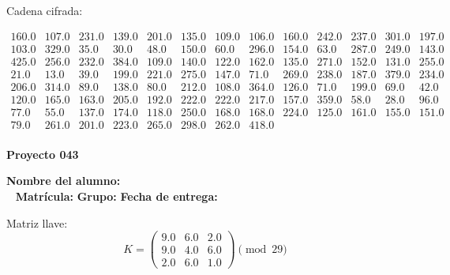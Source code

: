 \documentclass[12pt]{article}
\begin{document}
Cadena cifrada:
\begin{center}
$\begin{array}{lllllllllllll}
160.0 & 107.0 & 231.0 & 139.0 & 201.0 & 135.0 & 109.0 & 106.0 & 160.0 & 242.0 & 237.0 & 301.0 & 197.0\\
103.0 & 329.0 & 35.0 & 30.0 & 48.0 & 150.0 & 60.0 & 296.0 & 154.0 & 63.0 & 287.0 & 249.0 & 143.0\\
425.0 & 256.0 & 232.0 & 384.0 & 109.0 & 140.0 & 122.0 & 162.0 & 135.0 & 271.0 & 152.0 & 131.0 & 255.0\\
21.0 & 13.0 & 39.0 & 199.0 & 221.0 & 275.0 & 147.0 & 71.0 & 269.0 & 238.0 & 187.0 & 379.0 & 234.0\\
206.0 & 314.0 & 89.0 & 138.0 & 80.0 & 212.0 & 108.0 & 364.0 & 126.0 & 71.0 & 199.0 & 69.0 & 42.0\\
120.0 & 165.0 & 163.0 & 205.0 & 192.0 & 222.0 & 222.0 & 217.0 & 157.0 & 359.0 & 58.0 & 28.0 & 96.0\\
77.0 & 55.0 & 137.0 & 174.0 & 118.0 & 250.0 & 168.0 & 168.0 & 224.0 & 125.0 & 161.0 & 155.0 & 151.0\\
79.0 & 261.0 & 201.0 & 223.0 & 265.0 & 298.0 & 262.0 & 418.0\\
\end{array}$
\end{center}

\newpage


\textbf{Proyecto 043}

\textbf{Nombre del alumno:} \underline{\hspace{13cm}}\\\
\vspace{1cm}
\textbf{Matrícula:} \underline{\hspace{4cm}} \hspace{1cm}
\textbf{Grupo:} \underline{\hspace{2cm}}
\textbf{Fecha de entrega:} \underline{\hspace{2cm}}

\medskip

Matriz llave:
\[
K = \begin{pmatrix}
9.0 & 6.0 & 2.0\\
9.0 & 4.0 & 6.0\\
2.0 & 6.0 & 1.0
\end{pmatrix} \pmod{29}
\]
\end{document}
